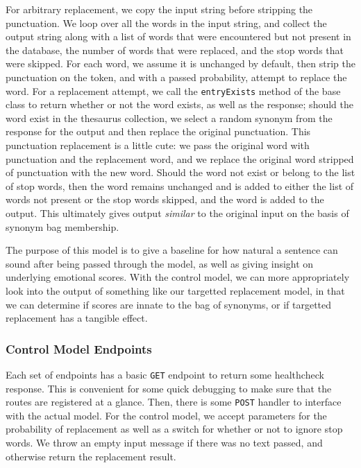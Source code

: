 \documentclass[11pt, twoside, reqno]{book}
\begin{document}
For arbitrary replacement, we copy the input string before stripping the punctuation. We loop over all the words in the input string, and collect the output string along with a list of words that were encountered but not present in the database, the number of words that were replaced, and the stop words that were skipped. For each word, we assume it is unchanged by default, then strip the punctuation on the token, and with a passed probability, attempt to replace the word. For a replacement attempt, we call the \texttt{entryExists} method of the base class to return whether or not the word exists, as well as the response; should the word exist in the thesaurus collection, we select a random synonym from the response for the output and then replace the original punctuation. This punctuation replacement is a little cute: we pass the original word with punctuation and the replacement word, and we replace the original word stripped of punctuation with the new word. Should the word not exist or belong to the list of stop words, then the word remains unchanged and is added to either the list of words not present or the stop words skipped, and the word is added to the output. This ultimately gives output \textit{similar} to the original input on the basis of synonym bag membership.

The purpose of this model is to give a baseline for how natural a sentence can sound after being passed through the model, as well as giving insight on underlying emotional scores. With the control model, we can more appropriately look into the output of something like our targetted replacement model, in that we can determine if scores are innate to the bag of synonyms, or if targetted replacement has a tangible effect.

\subsubsection{\textbf{Control Model Endpoints}}

Each set of endpoints has a basic \texttt{GET} endpoint to return some healthcheck response. This is convenient for some quick debugging to make sure that the routes are registered at a glance. Then, there is some \texttt{POST} handler to interface with the actual model. For the control model, we accept parameters for the probability of replacement as well as a switch for whether or not to ignore stop words. We throw an empty input message if there was no text passed, and otherwise return the replacement result.
\end{document}
